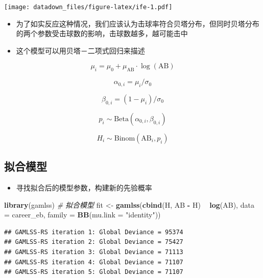 \documentclass[
]{book}
\newenvironment{Shaded}{\begin{snugshade}}{\end{snugshade}}
\newcommand{\CommentTok}[1]{\textcolor[rgb]{0.56,0.35,0.01}{\textit{#1}}}
\newcommand{\DataTypeTok}[1]{\textcolor[rgb]{0.13,0.29,0.53}{#1}}
\newcommand{\KeywordTok}[1]{\textcolor[rgb]{0.13,0.29,0.53}{\textbf{#1}}}
\newcommand{\NormalTok}[1]{#1}
\newcommand{\OperatorTok}[1]{\textcolor[rgb]{0.81,0.36,0.00}{\textbf{#1}}}
\newcommand{\StringTok}[1]{\textcolor[rgb]{0.31,0.60,0.02}{#1}}
\providecommand{\tightlist}{%
  \setlength{\itemsep}{0pt}\setlength{\parskip}{0pt}}
\begin{document}
\texttt{[image: datadown\_files/figure-latex/ife-1.pdf]}

\begin{itemize}
\item
  为了如实反应这种情况，我们应该认为击球率符合贝塔分布，但同时贝塔分布的两个参数受击球数的影响，击球数越多，越可能击中
\item
  这个模型可以用贝塔－二项式回归来描述
\end{itemize}

\[\mu_i = \mu_0 + \mu_{\mbox{AB}} \cdot \log(\mbox{AB})\]

\[\alpha_{0,i} = \mu_i / \sigma_0\]

\[\beta_{0,i} = (1 - \mu_i) / \sigma_0\]

\[p_i \sim \mbox{Beta}(\alpha_{0,i}, \beta_{0,i})\]

\[H_i \sim \mbox{Binom}(\mbox{AB}_i, p_i)\]

\hypertarget{ux62dfux5408ux6a21ux578b}{%
\subsection{拟合模型}\label{ux62dfux5408ux6a21ux578b}}

\begin{itemize}
\tightlist
\item
  寻找拟合后的模型参数，构建新的先验概率
\end{itemize}

\begin{Shaded}
\begin{Highlighting}[]
\KeywordTok{library}\NormalTok{(gamlss)}
\CommentTok{# 拟合模型}
\NormalTok{fit <-}\StringTok{ }\KeywordTok{gamlss}\NormalTok{(}\KeywordTok{cbind}\NormalTok{(H, AB }\OperatorTok{-}\StringTok{ }\NormalTok{H) }\OperatorTok{~}\StringTok{ }\KeywordTok{log}\NormalTok{(AB),}
              \DataTypeTok{data =}\NormalTok{ career_eb,}
              \DataTypeTok{family =} \KeywordTok{BB}\NormalTok{(}\DataTypeTok{mu.link =} \StringTok{"identity"}\NormalTok{))}
\end{Highlighting}
\end{Shaded}

\begin{verbatim}
## GAMLSS-RS iteration 1: Global Deviance = 95374 
## GAMLSS-RS iteration 2: Global Deviance = 75427 
## GAMLSS-RS iteration 3: Global Deviance = 71113 
## GAMLSS-RS iteration 4: Global Deviance = 71107 
## GAMLSS-RS iteration 5: Global Deviance = 71107
\end{verbatim}
\end{document}
